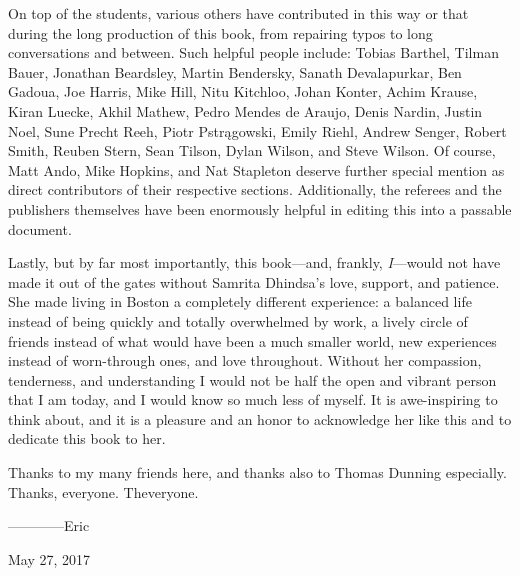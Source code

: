 On top of the students, various others have contributed in this way or that during the long production of this book, from repairing typos to long conversations and between.  Such helpful people include: Tobias Barthel, Tilman Bauer, Jonathan Beardsley, Martin Bendersky, Sanath Devalapurkar, Ben Gadoua, Joe Harris, Mike Hill, Nitu Kitchloo, Johan Konter, Achim Krause, Kiran Luecke, Akhil Mathew, Pedro Mendes de Araujo, Denis Nardin, Justin Noel, Sune Precht Reeh, Piotr Pstr\k{a}gowski, Emily Riehl, Andrew Senger, Robert Smith, Reuben Stern, Sean Tilson, Dylan Wilson, and Steve Wilson.  Of course, Matt Ando, Mike Hopkins, and Nat Stapleton deserve further special mention as direct contributors of their respective sections.  Additionally, the referees and the publishers themselves have been enormously helpful in editing this into a passable document.

Lastly, but by far most importantly, this book---and, frankly, \emph{I}---would not have made it out of the gates without Samrita Dhindsa's love, support, and patience.  She made living in Boston a completely different experience: a balanced life instead of being quickly and totally overwhelmed by work, a lively circle of friends instead of what would have been a much smaller world, new experiences instead of worn-through ones, and love throughout.  Without her compassion, tenderness, and understanding I would not be half the open and vibrant person that I am today, and I would know so much less of myself.  It is awe-inspiring to think about, and it is a pleasure and an honor to acknowledge her like this and to dedicate this book to her.

Thanks to my many friends here, and thanks also to Thomas Dunning especially.  Thanks, everyone.  Theveryone.

\vspace{2\baselineskip}
\hspace{3em} ------------Eric

\hspace{7em} May 27{\th}, 2017
